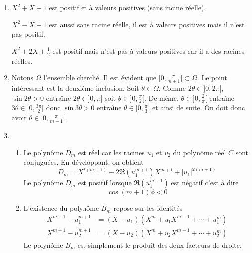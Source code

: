 \begin{enumerate}
\item $X^2+X+1$  est positif et {\`a} valeurs positives (sans racine r{\'e}elle).

  $X^2-X+1$ est aussi sans racine r{\'e}elle, il est {\`a} valeurs positives mais il n'est pas positif.

  $X^2+2X+\frac{1}{2}$ est positif mais n'est pas {\`a} valeurs positives car il a des racines r{\'e}elles.

\item Notons $\Omega$ l'ensemble cherché. Il est évident que $ ]0,\frac{\pi}{m+1}[ \subset \Omega$. Le point intéressant est la deuxième inclusion.\newline
Soit $\theta\in \Omega$. Comme $2\theta\in]0,2\pi[$, $\sin2\theta>0$ entra{\^\i}ne $2\theta\in]0,\pi[$ soit $\theta\in]0,\frac{\pi}{2}[$. De m{\^e}me, $\theta\in]0,\frac{2}{\pi}[$ entra{\^\i}ne $3\theta\in ]0,\frac{3\pi}{2}[$ donc $\sin 3\theta>0$ entra{\^\i}ne $\theta\in]0,\frac{\pi}{3}[$ et ainsi de suite. On doit donc avoir $\theta \in ]0,\frac{\pi}{m+1}[$.

\item \begin{enumerate}
\item Le polyn{\^o}me $D_m$ est r{\'e}el car les racines $u_1$ et $u_2$ du polyn{\^o}me r{\'e}el $C$ sont conjugu{\'e}es. En d{\'e}veloppant, on obtient
\begin{displaymath}
D_m=X^{2(m+1)}-2\Re (u_1^{m+1})X^{m+1}+|u_1|^{2(m+1)}
\end{displaymath}
 Le polyn{\^o}me $D_m$ est positif lorsque $\Re (u_1^{m+1})$ est n{\'e}gatif c'est {\`a} dire
\begin{displaymath}
 \cos (m+1)\phi<0
\end{displaymath}

\item L'existence du polyn{\^o}me $B_m$ repose sur les identit{\'e}s
\begin{align*}
  X^{m+1} - u_1^{m+1} &= (X-u_1)(X^m+u_1X^{m-1}+\cdots+u_1^m)\\
  X^{m+1} - u_2^{m+1} &= (X-u_2)(X^m+u_2X^{m-1}+\cdots+u_2^m)
\end{align*}
Le polyn{\^o}me $B_m$ est simplement le produit des deux facteurs de droite.


\end{enumerate}
\end{enumerate}
